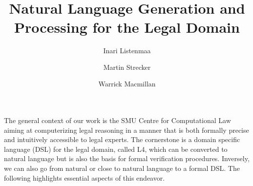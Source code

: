 \documentclass[runningheads]{llncs}
\begin{document}
%
\title{Natural Language Generation and Processing for the Legal Domain}
%
%
\author{Inari Listenmaa \and
Martin Strecker \and
Warrick Macmillan}  
%
%
%
%
\maketitle              %
%

%
%
%

The general context of our work is the SMU Centre for Computational Law %
aiming at computerizing legal reasoning in a manner that is both formally precise and intuitively accessible to legal experts. 
The cornerstone is a domain specific language (DSL) for the legal domain, called L4, 
which can be converted to natural language but is also the basis for formal verification procedures.
Inversely, we can also go from natural or close to natural language to a formal DSL. The following highlights essential aspects of this endeavor. 

\end{document}
